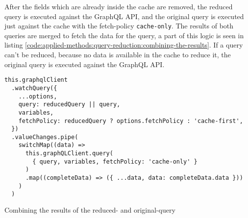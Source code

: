 \noindent After the fields which are already inside the cache are removed, the reduced query is executed against the GraphQL \ac{API}, and the original query is executed just against the cache with the fetch-policy \texttt{cache-only}. The results of both queries are merged to fetch the data for the query, a part of this logic is seen in listing \ref{code:applied-methods:query-reduction:combining-the-results}. If a query can't be reduced, because no data is available in the cache to reduce it, the original query is executed against the GraphQL \ac{API}.

\ifshowListings
\begin{listing}[H]
\begin{verbatim}
this.graphqlClient
  .watchQuery({
    ...options,
    query: reducedQuery || query,
    variables,
    fetchPolicy: reducedQuery ? options.fetchPolicy : 'cache-first',
  })
  .valueChanges.pipe(
    switchMap((data) =>
      this.graphQLClient.query(
        { query, variables, fetchPolicy: 'cache-only' }
      )
      .map((completeData) => ({ ...data, data: completeData.data }))
    )
  )
\end{verbatim}
\caption{Combining the results of the reduced- and original-query}\label{code:applied-methods:query-reduction:combining-the-results}
\end{listing}
\fi

\